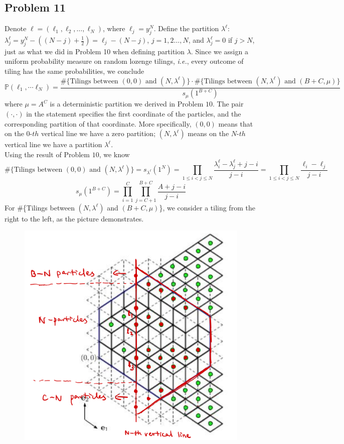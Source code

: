 \documentclass[12pt]{article}
\begin{document}
	\subsection*{Problem 11}
	Denote $\ell=(\ell_{1},\ell_{2},\dots,\ell_{N})$, where $\ell_{j}=y_{j}^{N}$. Define the partition $\lambda^{\ell}$: $\lambda^{\ell}_{j}=y_{j}^{N}-((N-j)+\frac{1}{2})=\ell_{j}-(N-j)$, $j=1,2\dots,N$, and $\lambda_{j}^{\ell}=0$ if $j>N$, just as what we did in Problem 10 when defining partition $\lambda$. Since we assign a uniform probability measure on random lozenge tilings, \emph{i.e.}, every outcome of tiling has the same probabilities, we conclude $$\mathbb P(\ell_1,\cdots \ell_N)=\frac{\#\{\text{Tilings between $(0,0)$ and $(N,\lambda^{\ell})$}\}\cdot \#\{\text{Tilings between $(N,\lambda^{\ell})$ and $(B+C,\mu)$}\}}{s_\mu(1^{B+C})}$$
	where $\mu=A^{C}$ is a deterministic partition we derived in Problem $10$. The pair $(\cdot,\cdot)$ in the statement specifies the first coordinate of the particles, and the corresponding partition of that coordinate. More specifically, $(0,0)$ means that on the $0$-$th$ vertical line we have a zero partition; $(N,\lambda^{\ell})$ means on the $N$-$th$ vertical line we have a partition $\lambda^{\ell}$.\\
	Using the result of Problem $10$, we know $$\#\{\text{Tilings between $(0,0)$ and $(N,\lambda^{\ell})$}\}=s_{\lambda^{\ell}}(1^{N})=\prod_{1\leqslant i<j\leqslant N}\frac{\lambda^{\ell}_{i}-\lambda^{\ell}_{j}+j-i}{j-i}=\prod_{1\leqslant i<j\leqslant N}\frac{\ell_{i}-\ell_{j}}{j-i}$$
	$$s_{\mu}(1^{B+C})=\prod_{i=1}^{C}\prod_{j=C+1}^{B+C}\frac{A+j-i}{j-i}$$
	For \#\{Tilings between $(N,\lambda^{\ell})$ and $(B+C,\mu)$\}, we consider a tiling from the right to the left, as the picture demonstrates.
	\begin{figure}[h]
		\centering
		\includegraphics[scale=0.2]{converse-tiling}
	\end{figure}  
\end{document}
